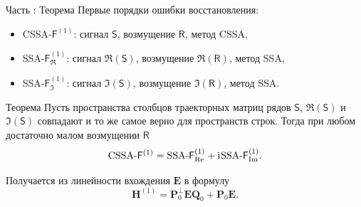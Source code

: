 \documentclass[10pt, ucs, notheorems, handout]{beamer}
\newcommand{\tX}[1]{\mathsf{#1}}
\newcommand{\iu}{\mathrm{i}\mkern1mu}
\newcommand{\RomanNumeralCaps}[1]
{\MakeUppercase{\romannumeral #1}}
\begin{document}
\begin{frame}{Часть \RomanNumeralCaps{2}: Теорема}
	Первые порядки ошибки восстановления:
	\begin{itemize}
	\item CSSA-$\tX{F}^{(1)}$: сигнал $\tX{S}$, возмущение $\tX{R}$, метод CSSA,
	\item SSA-$\tX{F}^{(1)}_{\Re}$: сигнал $\Re(\tX{S})$, возмущение $\Re(\tX{R})$, метод SSA,	
	\item SSA-$\tX{F}^{(1)}_{\Im}$: сигнал $\Im(\tX{S})$, возмущение $\Im(\tX{R})$, метод SSA.
	\end{itemize}

    \begin{block}{Теорема \label{th:sum}}
        Пусть пространства столбцов траекторных матриц рядов $\tX{S}$, $\Re(\tX{S})$ и $\Im(\tX{S})$ совпадают и то же самое верно для пространств строк.
    Тогда при любом достаточно малом возмущении $\tX{R}$
    $$\text{CSSA-}\tX{F}^{(1)} = \text{SSA-}\tX{F}^{(1)}_{\Re} + \iu\text{SSA-}\tX{F}^{(1)}_{\Im}.$$
    \end{block}
    Получается из линейности вхождения $\mathbf{E}$ в формулу
    $$\mathbf{H}^{(1)} = \mathbf{P}^{\perp}_0 \mathbf{E} \mathbf{Q}_0 + \mathbf{P}_0 \mathbf{E}.$$
\end{frame}

%
%
%
%
%
\end{document}
